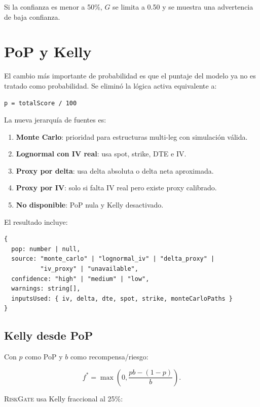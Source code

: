 \documentclass[11pt,letterpaper]{article}
\newcommand{\RiskGate}{\textsc{RiskGate}}
\begin{document}
Si la confianza es menor a 50\%, $G$ se limita a 0.50 y se muestra una
advertencia de baja confianza.

\section{PoP y Kelly}

El cambio m\'as importante de probabilidad es que el puntaje del modelo ya no es
tratado como probabilidad. Se elimin\'o la l\'ogica activa equivalente a:

\begin{lstlisting}
p = totalScore / 100
\end{lstlisting}

La nueva jerarqu\'ia de fuentes es:

\begin{enumerate}[noitemsep]
  \item \textbf{Monte Carlo}: prioridad para estructuras multi-leg con simulaci\'on
        v\'alida.
  \item \textbf{Lognormal con IV real}: usa spot, strike, DTE e IV.
  \item \textbf{Proxy por delta}: usa delta absoluta o delta neta aproximada.
  \item \textbf{Proxy por IV}: solo si falta IV real pero existe proxy calibrado.
  \item \textbf{No disponible}: PoP nula y Kelly desactivado.
\end{enumerate}

El resultado incluye:

\begin{lstlisting}
{
  pop: number | null,
  source: "monte_carlo" | "lognormal_iv" | "delta_proxy" |
          "iv_proxy" | "unavailable",
  confidence: "high" | "medium" | "low",
  warnings: string[],
  inputsUsed: { iv, delta, dte, spot, strike, monteCarloPaths }
}
\end{lstlisting}

\subsection{Kelly desde PoP}

Con $p$ como PoP y $b$ como recompensa/riesgo:

\[
f^* = \max\left(0,\frac{p b - (1-p)}{b}\right).
\]

\RiskGate{} usa Kelly fraccional al 25\%:
\end{document}
